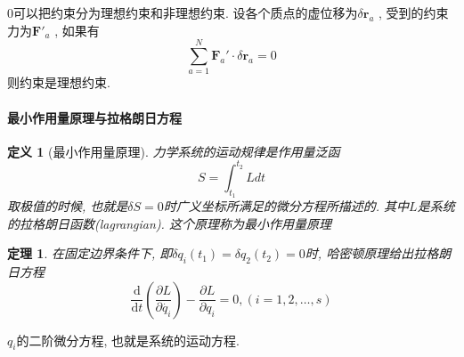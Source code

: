 \documentclass[a4paper,11pt]{article}
\newtheorem{definition}{\hspace{2em}定义}[section]
\newtheorem{theorem}{\hspace{2em}定理}[section]
\begin{document}
$0$可以把约束分为理想约束和非理想约束. 设各个质点的虚位移为$\delta\mathbf{r}_a$ , 受到的约束力为$\mathbf{F'}_a$ , 如果有
\begin{equation*}
  \sum_{a=1}^{N}\mathbf{F}_a'\cdot\delta\mathbf{r}_a=0
\end{equation*}
则约束是理想约束.
\paragraph*{最小作用量原理与拉格朗日方程}\label{Least Action section}
\begin{definition}[最小作用量原理]\label{Least Action rule}
  力学系统的运动规律是作用量泛函
\begin{equation*}
  S=\int_{t_1}^{t_2}Ldt
\end{equation*}
取极值的时候, 也就是$\delta S=0$时广义坐标所满足的微分方程所描述的. 其中$L$是系统的拉格朗日函数(lagrangian). 这个原理称为最小作用量原理
\end{definition}
\begin{theorem}
  在固定边界条件下, 即$\delta q_i(t_1)=\delta q_2(t_2)=0$时, 哈密顿原理给出拉格朗日方程
  \begin{equation*}
    \frac{\mathrm{d}}{\mathrm{d}t}(\frac{\partial {L}}{\partial{\dot{q_i}}})-\frac{\partial{L}}{\partial{q_i}}=0,(i=1,2,\dots,s)
  \end{equation*}
\end{theorem}
$q_i$的二阶微分方程, 也就是系统的运动方程.
\end{document}

